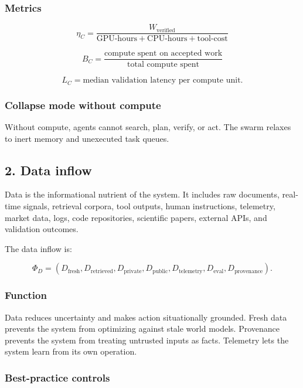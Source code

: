 \documentclass[11pt]{article}
\begin{document}
\subsubsection{Metrics}\label{metrics}

\[
\eta_C=\frac{W_{\text{verified}}}{\text{GPU-hours}+\text{CPU-hours}+\text{tool-cost}}
\]

\[
B_C=\frac{\text{compute spent on accepted work}}{\text{total compute spent}}
\]

\[
L_C=\text{median validation latency per compute unit}.
\]

\subsubsection{Collapse mode without compute}\label{collapse-mode-without-compute}

Without compute, agents cannot search, plan, verify, or act. The swarm relaxes to inert memory and unexecuted task queues.

\subsection{2. Data inflow}\label{data-inflow}

Data is the informational nutrient of the system. It includes raw documents, real-time signals, retrieval corpora, tool outputs, human instructions, telemetry, market data, logs, code repositories, scientific papers, external APIs, and validation outcomes.

The data inflow is:

\[
\Phi_D=(D_{\text{fresh}},D_{\text{retrieved}},D_{\text{private}},D_{\text{public}},D_{\text{telemetry}},D_{\text{eval}},D_{\text{provenance}}).
\]

\subsubsection{Function}\label{function-1}

Data reduces uncertainty and makes action situationally grounded. Fresh data prevents the system from optimizing against stale world models. Provenance prevents the system from treating untrusted inputs as facts. Telemetry lets the system learn from its own operation.

\subsubsection{Best-practice controls}\label{best-practice-controls-1}
\end{document}
